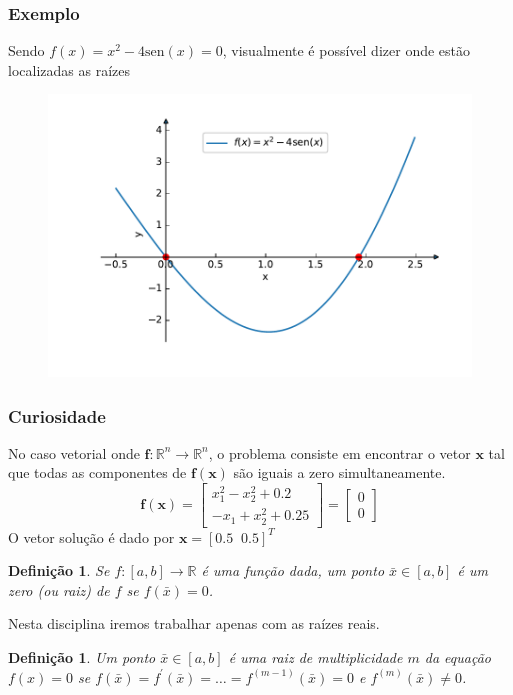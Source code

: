 \documentclass{beamer}
\newtheorem{definicao}[theorem]{Definição}
\theoremstyle{mystyle}
\begin{document}
\begin{frame}
	\frametitle{Exemplo}
	Sendo $ f(x) = x^{2} - 4 \mbox{sen}(x) = 0 $, visualmente é possível dizer onde estão localizadas as raízes
	\begin{figure}
		\centering
		\includegraphics[width=0.6\linewidth]{Figuras/grafico_01}
		\label{fig:grafico01}
	\end{figure}
\end{frame}

\begin{frame}
	\frametitle{Curiosidade}
	No caso vetorial onde $ \mathbf{f} : \mathbb{R}^{n} \rightarrow \mathbb{R}^{n} $, o problema consiste em encontrar o vetor $ \mathbf{x} $ tal que todas as componentes de $ \mathbf{f(x)} $ são iguais a zero simultaneamente.
	\begin{equation*}
		\mathbf{f(x)} = 
		\begin{bmatrix}
			x_{1}^{2} - x_{2}^{2} + 0.2 \\
			- x_{1} + x_{2}^{2} + 0.25
		\end{bmatrix}
		=
		\begin{bmatrix}
			0\\
			0
		\end{bmatrix}
	\end{equation*}
	\pause
	O vetor solução é dado por $ \mathbf{x} = [0.5\;\; 0.5]^{T} $
\end{frame}

\begin{frame}
	\begin{definicao} Se $ f : [a, b] \rightarrow \mathbb{R} $ é uma função dada, um ponto $ \bar{x} \in [a, b]  $ é um zero (ou raiz) de $ f $ se $ f (\bar{x}) = 0 $.
	\end{definicao}
	
	\alert{Nesta disciplina iremos trabalhar apenas com as raízes reais}.
	
	\begin{definicao} Um ponto $ \bar{x} \in [a, b]  $ é uma raiz de multiplicidade $ m $ da equação $ f (x) = 0 $ se $ f(\bar{x}) = f^{\prime}(\bar{x}) = \ldots = f^{(m-1)}(\bar{x}) = 0 $ e $ f^{(m)} (\bar{x}) \neq 0 $.
	\end{definicao}
\end{frame}
\end{document}

